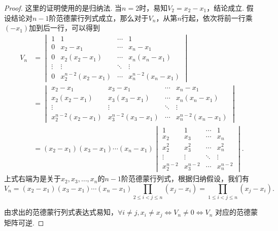 \begin{proof}
    这里的证明使用的是归纳法. 当$n=2$时，易知$V_2=x_2-x_1$，结论成立. 假设结论对$n-1$阶范德蒙行列式成立，那么对于$V_n$，从第$n$行起，依次将前一行乘$(-x_1)$加到后一行，可以得到\begin{align*}
        V_n & = \begin{vmatrix}
                    1      & 1                  & \cdots & 1                  \\
                    0      & x_2-x_1            & \cdots & x_n-x_1            \\
                    0      & x_2(x_2-x_1)       & \cdots & x_n(x_n-x_1)       \\
                    \vdots & \vdots             & \ddots & \vdots             \\
                    0      & x_2^{n-2}(x_2-x_1) & \cdots & x_n^{n-2}(x_n-x_1)
                \end{vmatrix} \\
            & = \begin{vmatrix}
                    x_2-x_1            & x_3-x_1            & \cdots & x_n-x_1            \\
                    x_2(x_2-x_1)       & x_3(x_3-x_1)       & \cdots & x_n(x_n-x_1)       \\
                    \vdots             & \vdots             & \ddots & \vdots             \\
                    x_2^{n-2}(x_2-x_1) & x_3^{n-2}(x_3-x_1) & \cdots & x_n^{n-2}(x_n-x_1)
                \end{vmatrix} \\
            & = (x_2-x_1)(x_3-x_1)\cdots(x_n-x_1)
        \begin{vmatrix}
            1         & 1         & \cdots & 1         \\
            x_2       & x_3       & \cdots & x_n       \\
            x_2^2     & x_3^2     & \cdots & x_n^2     \\
            \vdots    & \vdots    & \ddots & \vdots    \\
            x_2^{n-2} & x_3^{n-2} & \cdots & x_n^{n-2}
        \end{vmatrix}.
    \end{align*}
    上式右端为是关于$x_2,x_3,\ldots,x_n$的$n-1$阶范德蒙行列式，根据归纳假设，我们有
    \[
        V_n  = (x_2-x_1)(x_3-x_1)\cdots(x_n-x_1)\prod_{2 \leqslant i < j \leqslant n}(x_j-x_i)
        = \prod_{1 \leqslant i < j \leqslant n}(x_j-x_i).
    \]

    由求出的范德蒙行列式表达式易知，$\forall i \neq j, x_i \neq x_j \iff V_n \neq 0 \iff V_n$ 对应的范德蒙矩阵可逆.
\end{proof}

